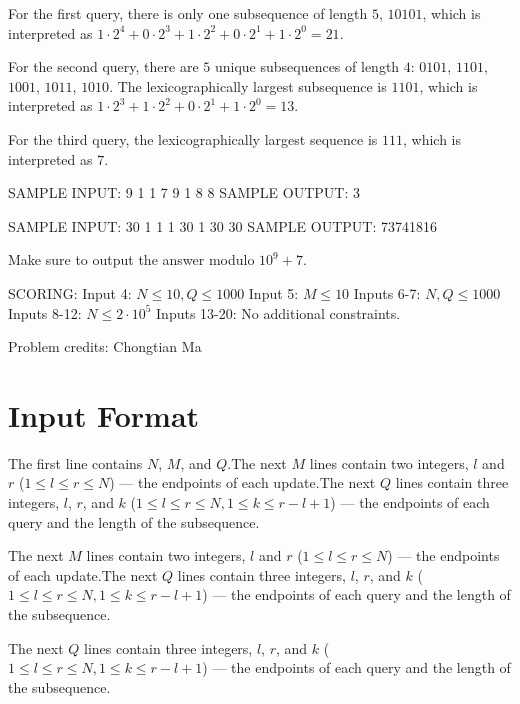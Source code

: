\documentclass[12pt]{article}
\begin{document}
For the first query, there is only one subsequence of length $5$, $10101$, which
is interpreted as
$1 \cdot 2^4 + 0 \cdot 2^3 + 1 \cdot 2^2 + 0 \cdot 2^1 + 1 \cdot 2^0 = 21$.

For the second query, there are $5$ unique subsequences of length $4$: $0101$,
$1101$, $1001$, $1011$, $1010$. The lexicographically largest subsequence is
$1101$, which is interpreted as
$1 \cdot 2^3 + 1 \cdot 2^2 + 0 \cdot 2^1 + 1\cdot 2^0 = 13$.

For the third query, the lexicographically largest sequence is $111$, which is
interpreted as $7$.

SAMPLE INPUT:
9 1 1
7 9
1 8 8
SAMPLE OUTPUT: 
3

SAMPLE INPUT:
30 1 1
1 30
1 30 30
SAMPLE OUTPUT: 
73741816

Make sure to output the answer modulo $10^9+7$.

SCORING:
 Input 4: $N \leq 10, Q \leq 1000$  Input 5: $M \leq 10$  Inputs 6-7: $N, Q \leq 1000$  Inputs 8-12: $N \leq 2 \cdot 10^5$
 Inputs 13-20: No additional constraints.


Problem credits: Chongtian Ma



\section*{Input Format}
The first line contains $N$, $M$, and $Q$.The next $M$ lines contain two integers, $l$ and $r$ ($1 \leq l \leq r \leq N$)
— the endpoints of each update.The next $Q$ lines contain three integers, $l$, $r$, and $k$
($1 \leq l \leq r \leq N, 1 \leq k \leq r - l + 1$) — the endpoints of each
query and the length of the subsequence.

The next $M$ lines contain two integers, $l$ and $r$ ($1 \leq l \leq r \leq N$)
— the endpoints of each update.The next $Q$ lines contain three integers, $l$, $r$, and $k$
($1 \leq l \leq r \leq N, 1 \leq k \leq r - l + 1$) — the endpoints of each
query and the length of the subsequence.

The next $Q$ lines contain three integers, $l$, $r$, and $k$
($1 \leq l \leq r \leq N, 1 \leq k \leq r - l + 1$) — the endpoints of each
query and the length of the subsequence.
\end{document}
